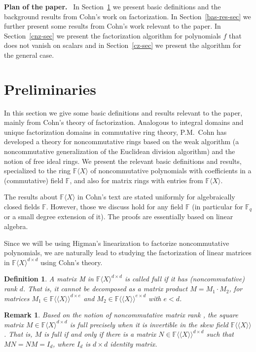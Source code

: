 \documentclass[10pt,a4paper]{article}
\newtheorem{definition}[theorem]{Definition}
\newtheorem{remark}[theorem]{Remark}
\newcommand{\F}{\mathbb{F}}
\renewcommand{\angle}[1]{\langle #1 \rangle}
\newcommand{\FX}{\F\angle{X}}
\newcommand{\fR}{\FX}
\newcommand{\skewf}{\mathbb{F}\newbrak{X}}
\newcommand{\fF}{\skewf}
\newcommand{\newbrak}[1]{\mathopen{\langle\!\langle}#1\mathclose{\rangle\!\rangle}}
\begin{document}
\smallskip

\noindent\textbf{Plan of the paper.}~ In Section~\ref{prelim} we
present basic definitions and the background results from Cohn's work on factorization. In Section~\ref{bas-res-sec} we further present some results from Cohn's work relevant to the paper. In
Section~\ref{cnz-sec} we present the factorization algorithm for
polynomials $f$ that does not vanish on scalars and in
Section~\ref{cz-sec} we present the algorithm for the general case.

\section{Preliminaries}\label{prelim}
%

In this section we give some basic definitions and results relevant to
the paper, mainly from Cohn's theory of factorization.  Analogous to
integral domains and unique factorization domains in commutative ring
theory, P.M.~Cohn \cite{Cohnfir,Cohnintro} has developed a theory for
noncommutative rings based on the weak algorithm (a noncommutative
generalization of the Euclidean division algorithm) and the notion of
free ideal rings. We present the relevant basic definitions and
results, specialized to the ring $\FX$ of noncommutative polynomials
with coefficients in a (commutative) field $\F$, and also for matrix
rings with entries from $\FX$.

The results about $\FX$ in Cohn's text \cite[Chapter 5]{Cohnfir} are
stated uniformly for algebraically closed fields $\F$. However, those
we discuss hold for any field $\F$ (in particular for $\F_q$ or a
small degree extension of it). The proofs are essentially based on
linear algebra.

%
%
%
%

%
%
%
%
%

Since we will be using Higman's linearization \cite{Hig} to factorize
noncommutative polynomials, we are naturally lead to studying the
factorization of linear matrices in $\fR^{d\times d}$ using Cohn's
theory.

\begin{definition}{\rm\cite{Cohnfir}}
A matrix M in $\fR^{d\times d}$ is called \emph{full} if it has
(noncommutative) rank $d$. That is, it cannot be decomposed as a
matrix product $M= M_1\cdot M_2$, for matrices $M_1 \in \fF^{d \times
  e}$ and $M_2 \in \fF^{e \times d}$ with $e <d$.
\end{definition}

\begin{remark}
 Based on the notion of noncommutative matrix rank \cite{Cohnfir}, the
 square matrix $M\in\fR^{d\times d}$ is full precisely when it is
 invertible in the skew field $\fF$. That is, $M$ is full if and only
 if there is a matrix $N\in\fF^{d\times d}$ such that $MN=NM=I_d$, where $I_d$ is $d \times
d$ identity matrix.
\end{remark}
\end{document}
